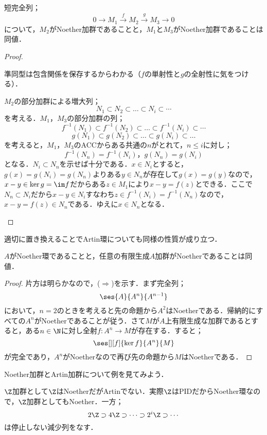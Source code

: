 \begin{prop}
	短完全列；
	\[0\longrightarrow M_1\overset{f}{\longrightarrow}M_2\overset{g}{\longrightarrow}M_3\longrightarrow0\]
	について，$M_2$がNoether加群であることと，$M_1$と$M_3$がNoether加群であることは同値．
\end{prop}
\begin{proof}
	\begin{eqv}
		\item 準同型は包含関係を保存するからわかる（$f$の単射性と$g$の全射性に気をつける）．
		\item $M_2$の部分加群による増大列；
		\[N_1\subset N_2\subset\dots\subset N_i\subset\cdots\]
		を考える．$M_1，M_3$の部分加群の列；
		\[f^{-1}(N_1)\subset f^{-1}(N_2)\subset\dots\subset f^{-1}(N_i)\subset\cdots\]
		\[g(N_1)\subset g(N_2)\subset\dots\subset g(N_i)\subset\dots\]
		を考えると，$M_1，M_3$のACCからある共通の$n$がとれて，$n\leq i$に対し；
		\[	f^{-1}(N_n)=f^{-1}(N_i)，g(N_n)=g(N_i)\]
		となる．$N_i\subset N_n$を示せば十分である．$x\in N_i$とすると，$g(x)=g(N_i)=g(N_n)$よりある$y\in N_n$が存在して$g(x)=g(y)$なので，$x-y\in\ker g=\im f$だからある$z\in M_1$により$x-y=f(z)$とできる．ここで$N_n\subset N_i$だから$x-y\in N_i$すなわち$z\in f^{-1}(N_i)=f^{-1}(N_n)$なので，$x-y=f(z)\in N_n$である．ゆえに$x\in N_n$となる．
	\end{eqv}
\end{proof}

適切に置き換えることでArtin環についても同様の性質が成り立つ．
\begin{prop}
	$A$がNoether環であることと，任意の有限生成$A$加群がNoetherであることは同値．
\end{prop}
\begin{proof}
		片方は明らかなので，($\Longrightarrow$)を示す．まず完全列；
		\[\ses{A}{A^n}{A^{n-1}}\]
		において，$n=2$のときを考えると先の命題から$A^2$はNoetherである．帰納的にすべての$A^n$がNoetherであることが従う．さて$M$が$A$上有限生成な加群であるとすると，ある$n\in\N$に対し全射$f:A^n\to M$が存在する．すると；
		\[\ses[][f]{\ker f}{A^n}{M}\]
		が完全であり，$A^n$がNoetherなので再び先の命題から$M$はNoetherである．
\end{proof}

Noether加群とArtin加群について例を見てみよう．

\begin{ex}
	$\Z$加群として$\Z$はNoetherだがArtinでない．実際$\Z$はPIDだからNoether環なので，$\Z$加群としてもNoether．一方；
	\[2\Z\supset4\Z\supset\dots\supset2^i\Z\supset\cdots\]
	は停止しない減少列をなす．
\end{ex}	

